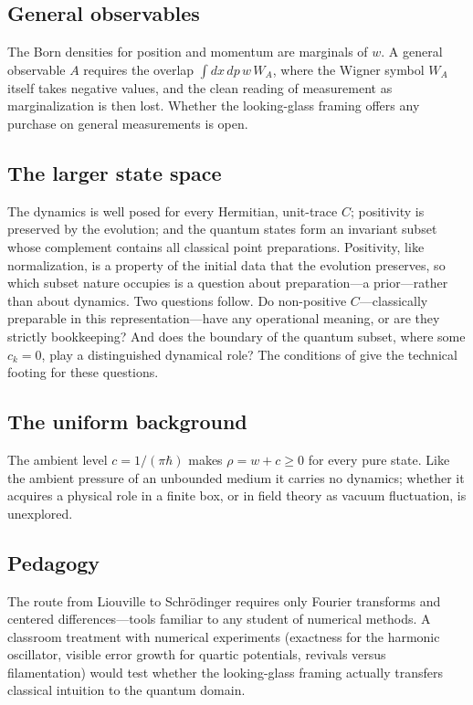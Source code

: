 \documentclass[12pt]{article}
\begin{document}
\subsection{General observables}
The Born densities for position and momentum are marginals of $w$.  A general observable $A$ requires the overlap $\int dx\, dp\, w\, W_A$, where the Wigner symbol $W_A$ itself takes negative values, and the clean reading of measurement as marginalization is then lost.  Whether the looking-glass framing offers any purchase on general measurements is open.

\subsection{The larger state space}
The dynamics is well posed for every Hermitian, unit-trace $C$; positivity is preserved by the evolution; and the quantum states form an invariant subset whose complement contains all classical point preparations.  Positivity, like normalization, is a property of the initial data that the evolution preserves, so which subset nature occupies is a question about preparation---a prior---rather than about dynamics.  Two questions follow.  Do non-positive $C$---classically preparable in this representation---have any operational meaning, or are they strictly bookkeeping?  And does the boundary of the quantum subset, where some $c_k = 0$, play a distinguished dynamical role?  The conditions of \cite{narcowich1986} give the technical footing for these questions.

\subsection{The uniform background}
The ambient level $c = 1/(\pi\hbar)$ makes $\rho = w + c \geq 0$ for every pure state.  Like the ambient pressure of an unbounded medium it carries no dynamics; whether it acquires a physical role in a finite box, or in field theory as vacuum fluctuation, is unexplored.

\subsection{Pedagogy}
The route from Liouville to Schr\"odinger requires only Fourier transforms and centered differences---tools familiar to any student of numerical methods.  A classroom treatment with numerical experiments (exactness for the harmonic oscillator, visible error growth for quartic potentials, revivals versus filamentation) would test whether the looking-glass framing actually transfers classical intuition to the quantum domain.


\end{document}
